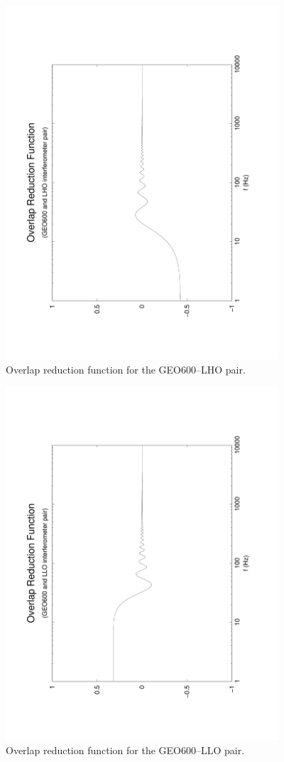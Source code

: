 \documentclass{article}
\begin{document}
%
%
\begin{figure}[htb!]
\begin{center}
\noindent\includegraphics[width=4in,angle=-90]{GEO600LHO}
\caption{\label{f:GEO600LHO}
Overlap reduction function for the GEO600--LHO pair.}
\end{center}
\end{figure}
%
%
\begin{figure}[htb!]
\begin{center}
\noindent\includegraphics[width=4in,angle=-90]{GEO600LLO}
\caption{\label{f:GEO600LLO}
Overlap reduction function for the GEO600--LLO pair.}
\end{center}
\end{figure}
\end{document}
